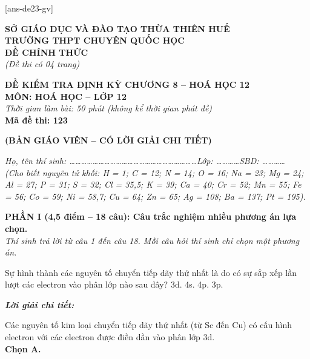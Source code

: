 \documentclass[11pt,a4paper]{article}
\def\loigiai#1{
\par\begingroup\color{blue!80!black}\small
\noindent\textbf{\textit{Lời giải chi tiết:}}\par
#1\par\endgroup}
\begin{document}
[ans-de23-gv]

\noindent
\begin{minipage}[t]{0.48\textwidth}
	\textbf{SỞ GIÁO DỤC VÀ ĐÀO TẠO THỪA THIÊN HUẾ}\\
	\textbf{TRƯỜNG THPT CHUYÊN QUỐC HỌC}\\
	\textbf{ĐỀ CHÍNH THỨC}\\
	\textit{(Đề thi có 04 trang)}
\end{minipage}\hfill
\begin{minipage}[t]{0.48\textwidth}
	\raggedleft
	\textbf{\color{mainGreen}ĐỀ KIỂM TRA ĐỊNH KỲ CHƯƠNG 8 -- HOÁ HỌC 12}\\
	\textbf{MÔN: HOÁ HỌC -- LỚP 12}\\
	\textit{Thời gian làm bài: 50 phút (không kể thời gian phát đề)}\\
	\textbf{Mã đề thi: 123}
\end{minipage}


\vspace{0.1cm}
\begin{center}
	\textbf{\color{hfRed}\Large (BẢN GIÁO VIÊN -- CÓ LỜI GIẢI CHI TIẾT)}
\end{center}

\vspace{1pt}
\noindent\textit{Họ, tên thí sinh: \dots\dots\dots\dots\dots\dots\dots\dots\dots\dots\dots\dots\dots\dots\dots\dots\dots\dots\dots\dots\dots\dots Lớp: \dots\dots\dots\dots SBD: \dots\dots\dots\dots}\\
\noindent\textit{(Cho biết nguyên tử khối: H = 1; C = 12; N = 14; O = 16; Na = 23; Mg = 24; Al = 27; P = 31; S = 32; Cl = 35,5; K = 39; Ca = 40; Cr = 52; Mn = 55; Fe = 56; Co = 59; Ni = 58,7; Cu = 64; Zn = 65; Ag = 108; Ba = 137; Pt = 195).}

\vspace{1pt}
\noindent
\textbf{PHẦN I (4,5 điểm -- 18 câu): Câu trắc nghiệm nhiều phương án lựa chọn.}\\
\textit{Thí sinh trả lời từ câu 1 đến câu 18. Mỗi câu hỏi thí sinh chỉ chọn một phương án.}

\begin{ex}
 Sự hình thành các nguyên tố chuyển tiếp dãy thứ nhất là do có sự sắp xếp lần lượt các electron vào phân lớp nào sau đây?
\choice
{\True 3d.}
{4s.}
{4p.}
{3p.}
\loigiai{
Các nguyên tố kim loại chuyển tiếp dãy thứ nhất (từ Sc đến Cu) có cấu hình electron với các electron được điền dần vào phân lớp 3d.\\
\textbf{Chọn A.}}
\end{ex}
\end{document}
